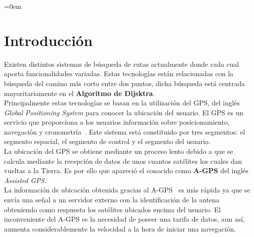 \parindent=0em
\section{Introducción}
\noindent

Existen distintos sistemas de búsqueda de rutas actualmente donde cada cual aporta funcionalidades variadas. Estas tecnologías están relacionadas con la búsqueda del camino más corto entre dos puntos, dicha búsqueda está centrada mayoritariamente en el \textbf{Algoritmo de Dijsktra}.\\

Principalmente estas tecnologías se basan en la utilización del GPS, del inglés \textit{Global Positioning System} para conocer la ubicación del usuario. El GPS es un servicio que proporciona a los usuarios información sobre posicionamiento, navegación y cronometría~\cite{GPSGOV}. Este sistema está constituido por tres segmentos: el segmento espacial, el segmento de control y el segmento del usuario.\\

La ubicación del GPS se obtiene mediante un proceso lento debido a que se calcula mediante la recepción de datos de unos cuantos satélites los cuales dan vueltas a la Tierra. Es por ello que apareció el conocido como \textbf{A-GPS} del inglés \textit{Assisted GPS}.\\

La información de ubicación obtenida gracias al A-GPS\footnotemark~ es más rápida ya que se envía una señal a un servidor externo con la identificación de la antena obteniendo como respuesta los satélites ubicados encima del usuario. El inconveniente del A-GPS es la necesidad de poseer una tarifa de datos, aun así, aumenta considerablemente la velocidad a la hora de iniciar una navegación.




